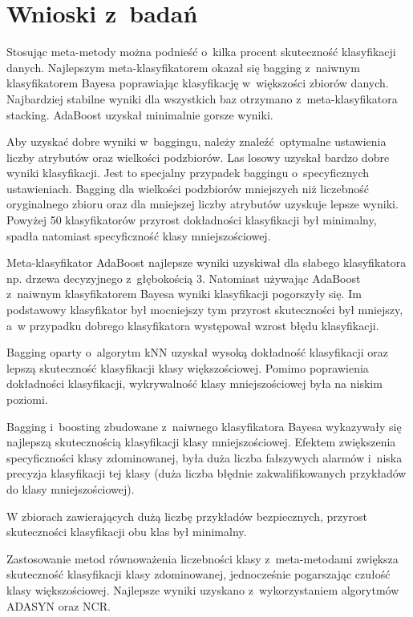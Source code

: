 \section{Wnioski z~badań}
Stosując meta-metody można podnieść o~kilka procent skuteczność klasyfikacji danych. Najlepszym meta-klasyfikatorem okazał się bagging z~naiwnym klasyfikatorem Bayesa poprawiając klasyfikację w~większości zbiorów danych. Najbardziej stabilne wyniki dla wszystkich baz otrzymano z~meta-klasyfikatora stacking. AdaBoost uzyskał minimalnie gorsze wyniki. \par
Aby uzyskać dobre wyniki w~baggingu, należy znaleźć optymalne ustawienia liczby atrybutów oraz wielkości podzbiorów. Las losowy uzyskał bardzo dobre wyniki klasyfikacji. Jest to specjalny przypadek baggingu o~specyficznych ustawieniach. Bagging dla wielkości podzbiorów mniejszych niż liczebność oryginalnego zbioru oraz dla mniejszej liczby atrybutów uzyskuje lepsze wyniki. Powyżej 50 klasyfikatorów przyrost dokładności klasyfikacji był minimalny, spadła natomiast specyficzność klasy mniejszościowej.\par
Meta-klasyfikator AdaBoost najlepsze wyniki uzyskiwał dla słabego klasyfikatora np. drzewa decyzyjnego z~głębokością 3. Natomiast używając AdaBoost z~naiwnym klasyfikatorem Bayesa wyniki klasyfikacji pogorszyły się. Im podstawowy klasyfikator był mocniejszy tym przyrost skuteczności był mniejszy, a~w przypadku dobrego klasyfikatora występował wzrost błędu klasyfikacji. \par
Bagging oparty o~algorytm kNN uzyskał wysoką dokładność klasyfikacji oraz lepszą skuteczność klasyfikacji klasy większościowej. Pomimo poprawienia dokładności klasyfikacji, wykrywalność klasy mniejszościowej była na niskim poziomi. \par
Bagging i~boosting zbudowane z~naiwnego klasyfikatora Bayesa wykazywały się najlepszą skutecznością klasyfikacji klasy mniejszościowej. Efektem zwiększenia specyficzności klasy zdominowanej, była duża liczba fałszywych alarmów i~niska precyzja klasyfikacji tej klasy (duża liczba błędnie zakwalifikowanych przykładów do klasy mniejszościowej). \par
W zbiorach zawierających dużą liczbę przykładów bezpiecznych, przyrost skuteczności klasyfikacji obu klas był minimalny. \par
Zastosowanie metod równoważenia liczebności klasy z~meta-metodami zwiększa skuteczność klasyfikacji klasy zdominowanej, jednocześnie pogarszając czułość klasy większościowej. Najlepsze wyniki uzyskano z~wykorzystaniem algorytmów ADASYN oraz NCR.